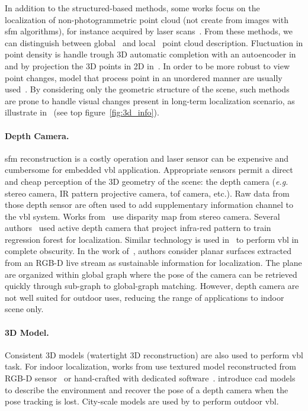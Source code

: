 			In addition to the structured-based methods, some works focus on the localization of non-photogrammetric point cloud (\ie not create from images with \ac{sfm} algorithms), for instance acquired by laser scans~\citep{Elbaz2017,Uy2018,Schonberger2017a,Zeng2016,Yew2018,Deng2018}. From these methods, we can distinguish between global~\citep{Uy2018,Schonberger2017a} and local~\citep{Elbaz2017,Zeng2016,Yew2018,Deng2018} point cloud description. Fluctuation in point density is handle trough 3D automatic completion with an autoencoder in~\citep{Schonberger2017a} and by projection the 3D points in 2D in~\citep{Elbaz2017}. In order to be more robust to view point changes, model that process point in an unordered manner are usually used~\citep{Yew2018,Deng2018}. By considering only the geometric structure of the scene, such methods are prone to handle visual changes present in long-term localization scenario, as illustrate in~\citep{Schonberger2017a,Uy2018} (see top figure~\ref{fig:3d_info}).

		\paragraph{Depth Camera.}
			\Ac{sfm} reconstruction is a costly operation and laser sensor can be expensive and cumbersome for embedded \ac{vbl} application. Appropriate sensors permit a direct and cheap perception of the 3D geometry of the scene: the depth camera (\textit{e.g.} stereo camera, IR pattern projective camera, \ac{tof} camera, etc.). Raw data from those depth sensor are often used to add supplementary information channel to the \ac{vbl} system. Works from~\citep{Ni2009,McManus2014,Wan2014} use disparity map from stereo camera. Several authors~\citep{Shotton2013,Guzman-rivera2014,Glocker2015} used active depth camera that project infra-red pattern to train regression forest for localization. Similar technology is used in~\citep{Li2016a} to perform \ac{vbl} in complete obscurity. In the work of~\citep{Fernandez-Moral2013}, authors consider planar surfaces extracted from an RGB-D live stream as sustainable information for localization. The plane are organized within global graph where the pose of the camera can be retrieved quickly through sub-graph to global-graph matching.  However, depth camera are not well suited for outdoor uses, reducing the range of applications to indoor scene only.

		\paragraph{3D Model.}
			Consistent 3D models (\ie watertight 3D reconstruction) are also used to perform \ac{vbl} task.  For indoor localization, works from \citep{Shotton2013,Pascoe2015} use textured model reconstructed from RGB-D sensor~\citep{Shotton2013} or hand-crafted with dedicated software~\citep{Pascoe2015}. \citet{Salas-Moreno2013} introduce \ac{cad} models to describe the environment and recover the pose of a depth camera when the pose tracking is lost. City-scale models are used by \citep{Aubry2014,Poglitsch2015,Pascoe2015a,Pascoe2015b,Caselitz2016} to perform outdoor \ac{vbl}. 

